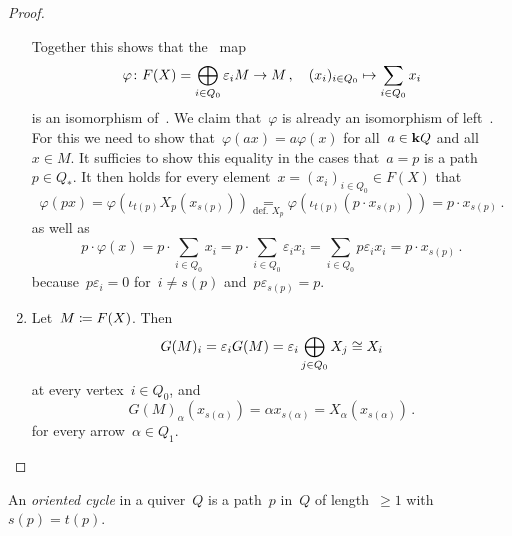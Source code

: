 \begin{proof}
\begin{enumerate}
      Together this shows that the~{\klin} map
      \[
                \varphi
        \colon  F(X)
        =       \bigoplus_{i \in Q_0} \varepsilon_i M
        \to     M \,,
        \quad   (x_i)_{i \in Q_0}
        \mapsto \sum_{i \in Q_0} x_i
      \]
      is an isomorphism of~{\modules{$\kf$}}.
      We claim that~$\varphi$ is already an isomorphism of left~{}.
      For this we need to show that~$\varphi(ax) = a \varphi(x)$ for all~$a \in \mathbf{k} Q$ and all~$x \in M$.
      It sufficies to show this equality in the cases that~$a = p$ is a path~$p \in Q_*$.
      It then holds for every element~$x = (x_i)_{i \in Q_0} \in F(X)$ that
      \[
        \varphi(px)
        =
        \varphi( \iota_{t(p)} X_p( x_{s(p)} ) )
        \underset{ \text{def.~$X_p$} }{=}
        \varphi( \iota_{t(p)}( p \cdot x_{s(p)} ) )
        =
        p \cdot x_{s(p)}  \,.
      \]
      as well as
      \[
          p \cdot \varphi(x)
        = p \cdot \sum_{i \in Q_0} x_i
        = p \cdot \sum_{i \in Q_0} \varepsilon_i x_i
        = \sum_{i \in Q_0} p \varepsilon_i x_i
        = p \cdot x_{s(p)} \,.
      \]
      because~$p \varepsilon_i = 0$ for~$i \neq s(p)$ and~$p \varepsilon_{s(p)} = p$.
    \item
      Let~$M \coloneqq F(X)$.
      Then
      \[
              G(M)_i
        =     \varepsilon_i G(M)
        =     \varepsilon_i \bigoplus_{j \in Q_0} X_j
        \cong X_i
      \]
      at every vertex~$i \in Q_0$, and
      \[
          G(M)_\alpha( x_{s(\alpha)} )
        = \alpha x_{s(\alpha)}
        = X_\alpha( x_{s(\alpha)} ) \,.
      \]
      for every arrow~$\alpha \in Q_1$.
    \qedhere
  \end{enumerate}
\end{proof}


\begin{definition*}
  An \emph{oriented cycle} in a quiver~$Q$ is a path~$p$ in~$Q$ of length~$\geq 1$ with~$s(p) = t(p)$.
\end{definition*}


